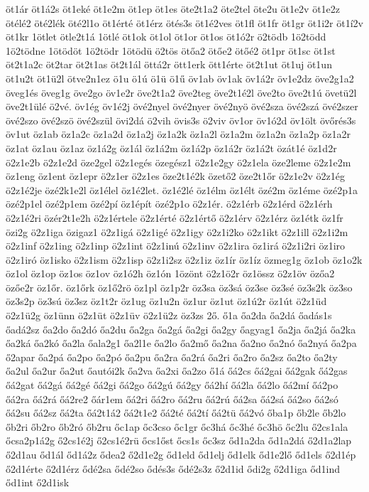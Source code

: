 {öt1ár
öt1á2s
öt1eké
öt1e2m
öt1ep
öt1es
öte2t1a2
öte2tel
öte2u
öt1e2v
öt1e2z
ötélé2
öté2lék
öté2l1o
öt1érté
öt1érz
ötés3s
öt1é2ves
öt1fl
öt1fr
öt1gr
öt1i2r
öt1í2v
öt1kr
1ötlet
ötle2t1á
1ötlé
öt1ok
öt1ol
öt1or
öt1os
öt1ó2r
ö2tödb
1ö2tödd
1ö2tödne
1ötödöt
1ö2tödr
1ötödü
ö2tös
ötőa2
ötőe2
ötőé2
öt1pr
öt1sc
öt1st
öt2t1a2c
öt2tar
öt2t1as
öt2t1ál
öttá2r
ött1erk
ött1érte
öt2t1ut
öt1uj
öt1un
öt1u2t
öt1ü2l
ötve2n1ez
ö1u
ö1ú
ö1ü
ö1ű
öv1ab
öv1ak
öv1á2r
öv1e2dz
öve2g1a2
öveg1és
öveg1g
öve2go
öv1e2r
öve2t1a2
öve2teg
öve2t1é2l
öve2to
öve2t1ú
övetü2l
öve2t1ülé
ö2vé.
öv1ég
öv1é2j
övé2nyel
övé2nyer
övé2nyö
övé2sza
övé2szá
övé2szer
övé2szo
övé2szö
övé2szül
övi2dá
ö2vih
övis3s
ö2viv
öv1or
öv1ó2d
öv1ölt
övőrés3s
öv1ut
öz1ab
öz1a2c
öz1a2d
öz1a2j
öz1a2k
öz1a2l
öz1a2m
öz1a2n
öz1a2p
öz1a2r
öz1at
öz1au
öz1az
öz1á2g
öz1ál
öz1á2m
öz1á2p
öz1á2r
öz1á2t
özát1é
öz1d2r
ö2z1e2b
ö2z1e2d
öze2gel
ö2z1egés
özegész1
ö2z1e2gy
ö2z1ela
öze2leme
ö2z1e2m
öz1eng
öz1ent
öz1epr
ö2z1er
ö2z1es
öze2t1é2k
özető2
öze2t1őr
ö2z1e2v
ö2z1ég
ö2z1é2je
özé2k1e2l
öz1élel
öz1é2let.
öz1é2lé
öz1élm
öz1élt
özé2m
öz1éme
özé2p1a
özé2p1el
özé2p1em
özé2pí
öz1épít
özé2p1o
ö2z1ér.
ö2z1érb
ö2z1érd
ö2z1érh
ö2z1é2ri
özér2t1e2h
ö2z1értele
ö2z1érté
ö2z1értő
ö2z1érv
ö2z1érz
öz1étk
öz1fr
özi2g
ö2z1iga
özigaz1
ö2z1igá
ö2z1igé
ö2z1igy
ö2z1i2ko
ö2z1ikt
ö2z1ill
ö2z1i2m
ö2z1inf
ö2z1ing
ö2z1inp
ö2z1int
ö2z1inú
ö2z1inv
ö2z1ira
öz1irá
ö2z1i2ri
öz1iro
ö2z1iró
öz1isko
ö2z1ism
ö2z1isp
ö2z1i2sz
ö2z1iz
öz1ír
öz1íz
özmeg1g
öz1ob
öz1o2k
öz1ol
öz1op
öz1os
öz1ov
öz1ó2h
öz1ón
1özönt
ö2z1ö2r
öz1össz
ö2z1öv
özőa2
özőe2r
öz1őr.
öz1őrk
öz1ő2rö
öz1pl
öz1p2r
öz3sa
öz3sá
öz3se
öz3sé
öz3s2k
öz3so
öz3s2p
öz3sú
öz3sz
öz1t2r
öz1ug
öz1u2n
öz1ur
öz1ut
öz1ú2r
öz1út
ö2z1üd
ö2z1ü2g
öz1ünn
ö2z1üt
ö2z1üv
ö2z1ü2z
öz3zs
2ő.
ő1a
őa2da
őa2dá
őadás1s
őadá2sz
őa2do
őa2dó
őa2du
őa2ga
őa2gá
őa2gi
őa2gy
őagyag1
őa2ja
őa2já
őa2ka
őa2ká
őa2kó
őa2la
őala2g1
őa2l1e
őa2lo
őa2mő
őa2na
őa2no
őa2nó
őa2nyá
őa2pa
ő2apar
őa2pá
őa2po
őa2pó
őa2pu
őa2ra
őa2rá
őa2ri
őa2ro
őa2sz
őa2to
őa2ty
őa2ul
őa2ur
őa2ut
őautói2k
őa2va
őa2xi
őa2zo
ő1á
őá2cs
őá2gai
őá2gak
őá2gas
őá2gat
őá2gá
őá2gé
őá2gi
őá2go
őá2gú
őá2gy
őá2hí
őá2la
őá2lo
őá2mí
őá2po
őá2ra
őá2rá
őá2re2
őár1em
őá2ri
őá2ro
őá2ru
őá2rú
őá2sa
őá2sá
őá2so
őá2só
őá2su
őá2sz
őá2ta
őá2t1á2
őá2t1e2
őá2té
őá2tí
őá2tü
őá2vó
őba1p
őb2le
őb2lo
őb2ri
őb2ro
őb2ró
őb2ru
őc1ap
őc3cso
őc1gr
őc3há
őc3hé
őc3hö
őc2lu
ő2cs1ala
őcsa2p1á2g
ő2cs1é2j
ő2cs1é2rü
őcs1őst
őcs1s
őc3sz
őd1a2da
őd1a2dá
ő2d1a2lap
ő2d1au
őd1ál
őd1á2z
ődea2
ő2d1e2g
őd1eld
őd1elj
őd1elk
őd1e2lő
őd1els
ő2d1ép
ő2d1érte
ő2d1érz
ődé2sa
ődé2so
ődés3s
ődé2s3z
ő2d1id
ődi2g
ő2d1iga
őd1ind
őd1int
ő2d1isk
}
